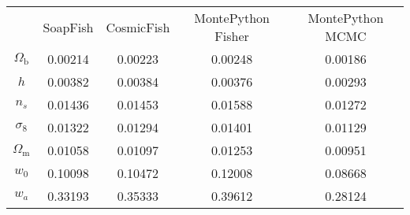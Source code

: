 \begin{table}
\centering
\begin{tabular}{|c|c|c|c|c|}
 & SoapFish & CosmicFish & MontePython Fisher & MontePython MCMC \\
$\Omega_\mathrm{b}$ & 0.00214 & 0.00223 & 0.00248 & 0.00186 \\
$h$ & 0.00382 & 0.00384 & 0.00376 & 0.00293 \\
$n_s$ & 0.01436 & 0.01453 & 0.01588 & 0.01272 \\
$\sigma_8$ & 0.01322 & 0.01294 & 0.01401 & 0.01129 \\
$\Omega_\mathrm{m}$ & 0.01058 & 0.01097 & 0.01253 & 0.00951 \\
$w_0$ & 0.10098 & 0.10472 & 0.12008 & 0.08668 \\
$w_a$ & 0.33193 & 0.35333 & 0.39612 & 0.28124 \\
\end{tabular}
\end{table}
